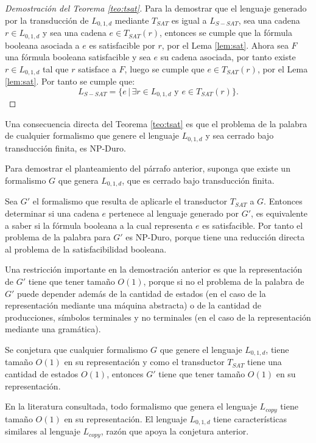 \begin{proof}[Demostración del Teorema \ref{teo:tsat}]
    Para la demostrar que el lenguaje generado por la transducción de $L_{0,1,d}$ mediante $T_{SAT}$ es igual a $L_{S-SAT}$, sea una cadena $r \in L_{0,1,d}$ y sea una cadena $e\in T_{SAT}(r)$, entonces 
    se cumple que la fórmula booleana asociada a $e$ es satisfacible por $r$, por el Lema \ref{lem:sat}. Ahora sea $F$ una fórmula 
    booleana satisfacible y sea $e$ su cadena asociada, por tanto existe $r\in L_{0,1,d}$ tal que $r$ satisface a $F$, luego se cumple que $e\in T_{SAT}(r)$, por el Lema \ref{lem:sat}. Por tanto se cumple que:
    $$L_{S-SAT} = \{e\,|\,\exists r \in L_{0,1,d} \text{ y } e \in T_{SAT}(r) \}.$$
    
\end{proof}

Una consecuencia directa del Teorema \ref{teo:tsat} es que el problema de la palabra de cualquier formalismo que genere el lenguaje $L_{0,1,d}$ y sea cerrado bajo transducción finita, es NP-Duro.

Para demostrar el planteamiento del párrafo anterior, suponga que existe un formalismo $G$ que genera $L_{0,1,d}$,
que es cerrado bajo transducción finita. 

Sea $G'$ el formalismo que resulta de aplicarle el transductor $T_{SAT}$ a $G$. Entonces determinar si una cadena
$e$ pertenece al lenguaje generado por $G'$, es equivalente a saber si la fórmula booleana a la cual representa
$e$ es satisfacible. Por tanto el problema de la palabra para
$G'$ es NP-Duro, porque tiene una reducción directa al problema de la satisfacibilidad booleana.

Una restricción importante en la demostración anterior es que la representación de $G'$ tiene que tener tamaño $O(1)$,
porque si no el problema de la palabra de $G'$ puede depender además de la cantidad de estados (en el caso de
la representación mediante una máquina abstracta) o de la cantidad de producciones, símbolos terminales y no terminales
(en el caso de la representación mediante una  gramática).

Se conjetura que cualquier formalismo $G$ que genere el lenguaje $L_{0,1,d}$, tiene tamaño $O(1)$ en su representación y como el transductor $T_{SAT}$ tiene una cantidad de estados $O(1)$, entonces $G'$ tiene que tener tamaño $O(1)$ en su representación.

En la literatura consultada, todo formalismo que genera el lenguaje $L_{copy}$ tiene tamaño $O(1)$ en su
representación. El lenguaje $L_{0,1,d}$ tiene características similares al  lenguaje $L_{copy}$,
razón que apoya la conjetura anterior.

